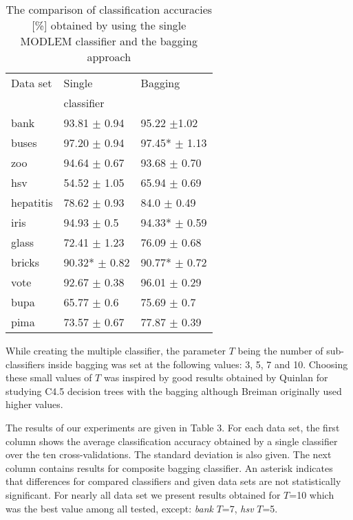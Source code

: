 \documentclass{elsart}
\begin{document}
\begin{table} \centering
\label{baggingtab}  \caption{The comparison of classification accuracies
[\%] obtained by using the single MODLEM classifier and the bagging
approach}
\begin{tabular}{lll}
\hline\noalign{\smallskip} Data set &  Single & Bagging \\
         & classifier &  \\
\noalign{\smallskip} \hline \noalign{\smallskip}
bank & 93.81
\scriptsize{$\pm$}  0.94 &  95.22 \scriptsize{$\pm$}1.02  \\ buses
& 97.20 \scriptsize{$\pm$ 0.94} & 97.45* \scriptsize{$\pm$ 1.13}
\\ zoo & 94.64 \scriptsize{$\pm$ 0.67}&  93.68 \scriptsize{$\pm$
0.70} \\ hsv & 54.52 \scriptsize{$\pm$ 1.05} & 65.94
\scriptsize{$\pm$ 0.69} \\ hepatitis & 78.62 \scriptsize{$\pm$
0.93} &  84.0 \scriptsize{$\pm$ 0.49} \\ iris & 94.93
\scriptsize{$\pm$ 0.5} & 94.33* \scriptsize{$\pm$ 0.59} \\ glass &
72.41 \scriptsize{$\pm$ 1.23} & 76.09 \scriptsize{$\pm$ 0.68} \\
bricks & 90.32* \scriptsize{$\pm$ 0.82} & 90.77* \scriptsize{$\pm$
0.72} \\ vote & 92.67 \scriptsize{$\pm$ 0.38}  & 96.01
\scriptsize{$\pm$ 0.29} \\ bupa & 65.77 \scriptsize{$\pm$ 0.6} &
75.69 \scriptsize{$\pm$ 0.7}
\\  pima & 73.57 \scriptsize{$\pm$ 0.67}  & 77.87
\scriptsize{$\pm$ 0.39} \\
 \hline
\end{tabular}
\end{table}

While creating the multiple classifier, the parameter $T$ being the number
of sub-classifiers inside bagging was set at the following values: 3, 5, 7
and 10. Choosing these small values of $T$ was inspired by good results
obtained by Quinlan for studying C4.5 decision trees with the bagging
\cite{Q96} although Breiman originally used higher values.


The results of our experiments are given in Table 3. For each data set, the
first column shows the average classification accuracy obtained by a single
classifier over the ten cross-validations. The standard deviation is also
given. The next column contains results for composite bagging classifier. An
asterisk indicates that differences for compared classifiers and given data
sets are not statistically significant.  For nearly all data set we present
results obtained for $T$=10 which was the best value among all tested,
except: {\em bank} $T$=7, {\em hsv} $T$=5.
\end{document}
